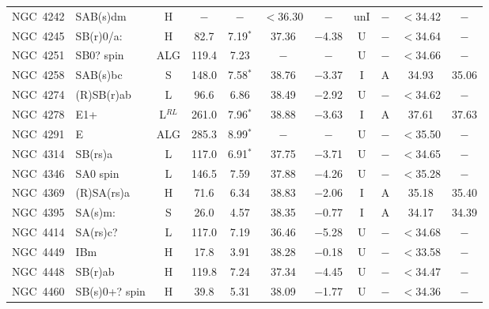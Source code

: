 \begin{center}
\begin{longtable}{lC{2.5cm}ccccccccc}
NGC~4242 & SAB(s)dm       & H        & $-$   & $-$               & $<$36.30   &   $-$       & unI &$-$       & $<$34.42 & $-$            \\
NGC~4245 & SB(r)0/a:      & H                & 82.7  & 7.19$^{*}$        & 37.36    & $-$4.38    & U   &$-$     & $<$34.64 & $-$            \\
NGC~4251 & SB0? spin      & ALG              & 119.4 & 7.23               & $-$      & $-$     & U   &$-$       & $<$34.66 & $-$            \\
NGC~4258 & SAB(s)bc       & S                & 148.0   & 7.58$^{*}$        & 38.76    & $-$3.37    & I   & A      & 34.93    & 35.06         \\
NGC~4274 & (R)SB(r)ab      & L        & 96.6  & 6.86              & 38.49    & $-$2.92   & U   &$-$        & $<$34.62 & $-$           \\
NGC~4278 & E1+             & L$^{RL}$                  & 261.0   & 7.96$^{*}$        & 38.88    & $-$3.63   & I   & A     & 37.61    & 37.63         \\
NGC~4291 & E               &   ALG              & 285.3 & 8.99$^{*}$         & $-$      & $-$         & U   &$-$     & $<$35.50 & $-$            \\
NGC~4314 & SB(rs)a        & L         & 117.0   & 6.91$^{*}$        & 37.75    & $-$3.71    & U   &$-$    & $<$34.65 & $-$           \\
NGC~4346 & SA0 spin        &    L         & 146.5 & 7.59               & 37.88    & $-$4.26     & U   &$-$       & $<$35.28 & $-$            \\
NGC~4369 & (R)SA(rs)a      & H                & 71.6  & 6.34                & 38.83    & $-$2.06     & I   & A        &  35.18  &  35.40        \\
NGC~4395 & SA(s)m:         &    S                & 26.0    & 4.57                & 38.35    & $-$0.77    & I   & A        & 34.17    & 34.39         \\
NGC~4414 & SA(rs)c?        &  L         & 117.0   & 7.19                 & 36.46    & $-$5.28    & U   &$-$        & $<$34.68 & $-$           \\
NGC~4449 & IBm             & H                & 17.8  & 3.91                & 38.28    & $-$0.18  & U   &$-$       & $<$33.58 & $-$            \\
NGC~4448 & SB(r)ab         & H                & 119.8 & 7.24                & 37.34    & $-$4.45     & U   &$-$       & $<$34.47 & $-$            \\
NGC~4460 & SB(s)0+? spin   & H                & 39.8  & 5.31                  & 38.09    & $-$1.77      & U   &$-$       & $<$34.36 & $-$            \\

\end{longtable}
\end{center}
